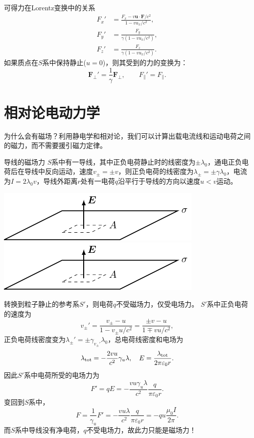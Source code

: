 可得力在Lorentz变换中的关系
\begin{subequations}
    \begin{align}
        F_x'&=\frac{F_x-v\bm u\cdot\bm F/c^2}{1-vu_x/c^2},\\
        F_y'&=\frac{F_y}{\gamma(1-vu_x/c^2)},\\
        F_z'&=\frac{F_z}{\gamma(1-vu_x/c^2)}.
    \end{align}
\end{subequations}
如果质点在$S$系中保持静止($u=0$)，则其受到的力的变换为：
\begin{equation}
    \bm F_\perp'=\frac1\gamma\bm F_\perp,\qquad F_\parallel'=F_\parallel.
\end{equation}
\section{相对论电动力学}
为什么会有磁场？利用静电学和相对论，我们可以计算出载电流线和运动电荷之间的磁力，而不需要援引磁力定律。
\begin{example}{导线的磁场力}{}
    $S$系中有一导线，其中正负电荷静止时的线密度为$\pm\lambda_0$，通电正负电荷后在导线中反向运动，速度$v_\pm=\pm v$，则正负电荷的线密度为$\lambda_\pm=\pm\gamma\lambda_0$，电流为$I=2\lambda_0v$，导线外距离$r$处有一电荷$q$沿平行于导线的方向以速度$u<v$运动。

    \begin{center}
        \includegraphics[page=32]{figures/tikz/layouts.pdf}
        \includegraphics[page=33]{figures/tikz/layouts.pdf}
    \end{center}
    转换到粒子静止的参考系$S'$，则电荷$q$不受磁场力，仅受电场力。
    $S'$系中正负电荷的速度为
    \[
        v_\pm'=\frac{v_\pm-u}{1-v_\pm u/c^2}=\frac{\pm v-u}{1\mp vu/c^2},
    \]
    正负电荷线密度变为$\lambda_\pm'=\pm\gamma_{v_\pm'}\lambda_0$，总电荷线密度和电场为
    \[
        \lambda_\mathrm{tot}=-\frac{2vu}{c^2}\gamma_u\lambda,\quad E=\frac{\lambda_\mathrm{tot}}{2\pi\varepsilon_0r}.
    \]
    因此$S'$系中电荷所受的电场力为
    \[
        F'=qE=-\frac{vu\gamma_u\lambda}{c^2}\frac q{\pi\varepsilon_0r}.
    \]
    变回到$S$系中，
    \[
        F=\frac1{\gamma_u}F'=-\frac{vu\lambda}{c^2}\frac q{\pi\varepsilon_0r}=-qu\frac{\mu_0I}{2\pi}.
    \]
    而$S$系中导线没有净电荷，$q$不受电场力，故此力只能是磁场力！
\end{example}
